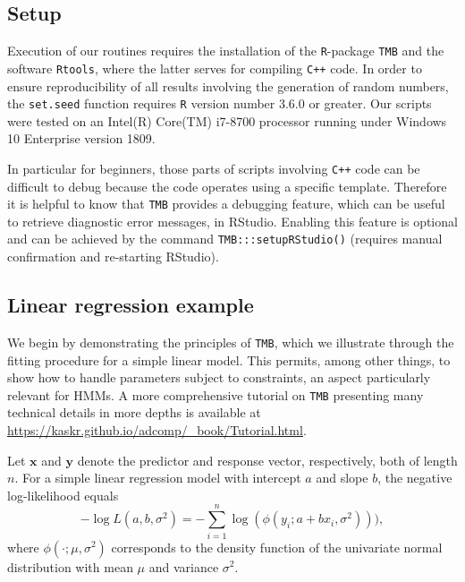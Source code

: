 \documentclass[bimj,fleqn]{w-art}\usepackage[]{graphicx}\usepackage[]{color}
\theoremstyle{plain}
\theoremstyle{definition}
\begin{document}
\subsection{Setup}
\label{sec:setup}

Execution of our routines requires the installation of the {\tt{R}}-package {\tt{TMB}} and the software {\tt{Rtools}}, where the latter serves for compiling {\tt{C++}} code.
In order to ensure reproducibility of all results involving the generation of random numbers, the \texttt{set.seed} function requires {\tt{R}} version number 3.6.0 or greater.
Our scripts were tested on an Intel(R) Core(TM) i7-8700 processor running under Windows 10 Enterprise version 1809.

In particular for beginners, those parts of scripts involving {\tt{C++}} code can be difficult to debug because the code operates using a specific template.
Therefore it is helpful to know that {\tt{TMB}} provides a debugging feature, which can be useful to retrieve diagnostic error messages, in RStudio.
Enabling this feature is optional and can be achieved by the command \texttt{TMB:::setupRStudio()} (requires manual confirmation and re-starting RStudio).



\subsection{Linear regression example}
\label{sec:linreg}

We begin by demonstrating the principles of {\tt{TMB}}, which we illustrate through the fitting procedure for a simple linear model.
This permits, among other things, to show how to handle parameters subject to constraints, an aspect particularly relevant for HMMs.
A more comprehensive tutorial on {\tt{TMB}} presenting many technical details in more depths is available at\\
\underline{\url{https://kaskr.github.io/adcomp/\_book/Tutorial.html}}.

Let $\bm{x}$ and $\bm{y}$ denote the predictor and response vector, respectively, both of length $n$.
For a simple linear regression model with intercept $a$ and slope $b$, the negative log-likelihood equals
\begin{equation*}
- \log L(a, b, \sigma^2) = - \sum_{i=1}^n \log(\phi(y_i; a + bx_i, \sigma^2))),
\end{equation*}
where $\phi(\cdot; \mu, \sigma^2)$ corresponds to the density function of the univariate normal distribution with mean $\mu$ and variance $\sigma^2$.
\end{document}
